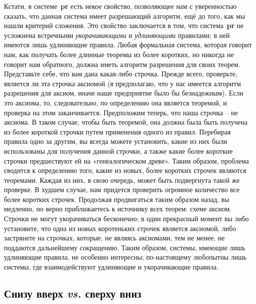 \documentclass[../main.tex]{subfiles}
\begin{document}
Кстати, в системе~\textbf{pr} есть некое свойство, позволяющее нам с уверенностью сказать, что данная система имеет разрешающий алгоритм, ещё до того, как мы нашли критерий сложения. Это свойство заключается в том, что система~\textbf{pr} не усложнена встречными \emph{укорачивающими} и \emph{удлиняющими} правилами; в ней имеются лишь удлиняющие правила. Любая формальная система, которая говорит нам, как получать более длинные теоремы из более коротких, но никогда не говорит нам обратного, должна иметь алгоритм разрешения для своих теорем. Представьте себе, что вам дана какая-либо строчка. Прежде всего, проверьте, является ли эта строчка аксиомой (я предполагаю, что у нас имеется алгоритм разрешения для аксиом, иначе наше предприятие было бы безнадежным). Если это аксиома, то, следовательно, по определению она является теоремой, и проверка на этом заканчивается. Предположим теперь, что наша строчка \--- не аксиома. В таком случае, чтобы быть теоремой, она должна была быть получена из более короткой строчки путем применения одного из правил. Перебирая правила одно за другим, вы всегда можете установить, какие из них были использованы для получения данной строчки, а также какие более короткие строчки предшествуют ей на «генеалогическом древе». Таким образом, проблема сводится к определению того, какие из новых, более коротких строчек являются теоремами. Каждая из них, в свою очередь, может быть подвергнута такой же проверке. В худшем случае, нам придется проверить огромное количество все более коротких строчек. Продолжая продвигаться таким образом назад, вы медленно, но верно приближаетесь к источнику всех теорем: схеме аксиом. Строчки не могут укорачиваться бесконечно; в один прекрасный момент вы либо установите, что одна из новых коротеньких строчек является аксиомой, либо застрянете на строчках, которые, не являясь аксиомами, тем не менее, не поддаются дальнейшему сокращению. Таким образом, системы, имеющие лишь удлиняющие правила, не особенно интересны; по-настоящему любопытны лишь системы, где взаимодействуют удлиняющие и укорачивающие правила.


\subsection{Снизу вверх \emph{vs.} сверху вниз}
\end{document}
